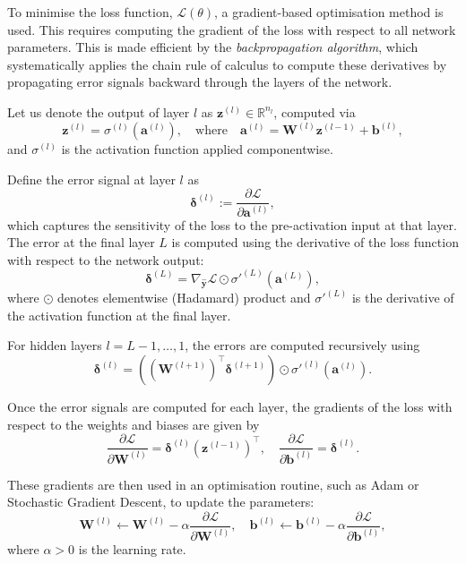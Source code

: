To minimise the loss function, \( \mathcal{L}(\theta) \), a gradient-based optimisation method is 
used. This requires
computing the gradient of the loss with respect to all network parameters. This is made efficient by 
the \emph{backpropagation algorithm}, which systematically applies the chain rule of calculus to 
compute these derivatives by propagating error signals backward through the layers of the network.

Let us denote the output of layer \( l \) as \( \mathbf{z}^{(l)} \in \mathbb{R}^{n_l} \), computed via
\[
    \mathbf{z}^{(l)} = \sigma^{(l)}\left( \mathbf{a}^{(l)} \right), \quad \text{where} \quad \mathbf{a}^{(l)} = \mathbf{W}^{(l)} \mathbf{z}^{(l-1)} + \mathbf{b}^{(l)},
\]
and \( \sigma^{(l)} \) is the activation function applied componentwise.

Define the error signal at layer \( l \) as
\[
    \boldsymbol{\delta}^{(l)} := \frac{\partial \mathcal{L}}{\partial \mathbf{a}^{(l)}},
\]
which captures the sensitivity of the loss to the pre-activation input at that layer. The error at the final layer \( L \) is computed using the derivative of the loss function with respect to the network output:
\[
    \boldsymbol{\delta}^{(L)} = \nabla_{\hat{\mathbf{y}}} \mathcal{L} \odot \sigma'^{(L)}\left( \mathbf{a}^{(L)} \right),
\]
where \( \odot \) denotes elementwise (Hadamard) product and \( \sigma'^{(L)} \) is the derivative of the activation function at the final layer.

For hidden layers \( l = L-1, \dots, 1 \), the errors are computed recursively using
\[
    \boldsymbol{\delta}^{(l)} = \left( (\mathbf{W}^{(l+1)})^\top \boldsymbol{\delta}^{(l+1)} \right) \odot \sigma'^{(l)}\left( \mathbf{a}^{(l)} \right).
\]

Once the error signals are computed for each layer, the gradients of the loss with respect to the weights and biases are given by
\[
    \frac{\partial \mathcal{L}}{\partial \mathbf{W}^{(l)}} = \boldsymbol{\delta}^{(l)} (\mathbf{z}^{(l-1)})^\top, \quad
    \frac{\partial \mathcal{L}}{\partial \mathbf{b}^{(l)}} = \boldsymbol{\delta}^{(l)}.
\]

These gradients are then used in an optimisation routine, such as Adam or Stochastic Gradient Descent,
to update the parameters:
\[
    \mathbf{W}^{(l)} \leftarrow \mathbf{W}^{(l)} - \alpha \frac{\partial \mathcal{L}}{\partial \mathbf{W}^{(l)}}, \quad
    \mathbf{b}^{(l)} \leftarrow \mathbf{b}^{(l)} - \alpha \frac{\partial \mathcal{L}}{\partial \mathbf{b}^{(l)}},
\]
where \( \alpha > 0 \) is the learning rate.

